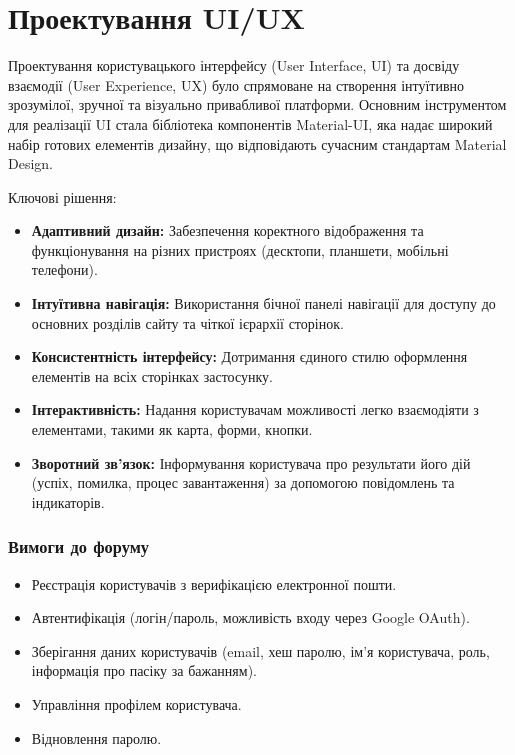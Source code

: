\section{Проектування UI/UX}
\label{sec:ui_ux}
Проектування користувацького інтерфейсу (User Interface, UI) та досвіду взаємодії (User Experience, UX) було спрямоване на створення інтуїтивно зрозумілої, зручної та візуально привабливої платформи. Основним інструментом для реалізації UI стала бібліотека компонентів Material-UI, яка надає широкий набір готових елементів дизайну, що відповідають сучасним стандартам Material Design. 

Ключові рішення:
\begin{itemize}
    \item \textbf{Адаптивний дизайн:} Забезпечення коректного відображення та функціонування на різних пристроях (десктопи, планшети, мобільні телефони).
    \item \textbf{Інтуїтивна навігація:} Використання бічної панелі навігації для доступу до основних розділів сайту та чіткої ієрархії сторінок.
    \item \textbf{Консистентність інтерфейсу:} Дотримання єдиного стилю оформлення елементів на всіх сторінках застосунку.
    \item \textbf{Інтерактивність:} Надання користувачам можливості легко взаємодіяти з елементами, такими як карта, форми, кнопки.
    \item \textbf{Зворотний зв'язок:} Інформування користувача про результати його дій (успіх, помилка, процес завантаження) за допомогою повідомлень та індикаторів.
\end{itemize}

\subsubsection{Вимоги до форуму}
\begin{itemize}
    \item Реєстрація користувачів з верифікацією електронної пошти.
    \item Автентифікація (логін/пароль, можливість входу через Google OAuth).
    \item Зберігання даних користувачів (email, хеш паролю, ім'я користувача, роль, інформація про пасіку за бажанням).
    \item Управління профілем користувача.
    \item Відновлення паролю.
\end{itemize}

